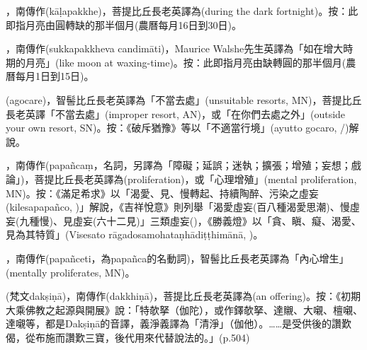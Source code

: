 \startitemgroup[noteitems]
\item{}，南傳作(kāḷapakkhe)，菩提比丘長老英譯為(during the dark fortnight)。按：此即指月亮由圓轉缺的那半個月(農曆每月16日到30日)。
\item{}，南傳作(sukkapakkheva candimāti)，Maurice Walshe先生英譯為「如在增大時期的月亮」(like moon at waxing-time)。按：此即指月亮由缺轉圓的那半個月(農曆每月1日到15日)。
\stopitemgroup

\startitemgroup[noteitems]
\item{}(agocare)，智髻比丘長老英譯為「不當去處」(unsuitable resorts, MN)，菩提比丘長老英譯「不當去處」(improper resort, AN)，或「在你們去處之外」(outside your own resort, SN)。按：《破斥猶豫》等以「不適當行境」(ayutto gocaro, /)解說。
\stopitemgroup

\startitemgroup[noteitems]
\item{}，南傳作(papañcaṃ，名詞，另譯為「障礙；延誤；迷執；擴張；增殖；妄想；戲論」)，菩提比丘長老英譯為(proliferation)，或「心理增殖」(mental proliferation, MN)。按：《滿足希求》以「渴愛、見、慢轉起、持續陶醉、污染之虛妄(kilesapapañco, )」解說，《吉祥悅意》則列舉「渴愛虛妄(百八種渴愛思潮)、慢虛妄(九種慢)、見虛妄(六十二見)」三類虛妄()，《勝義燈》以「貪、瞋、癡、渴愛、見為其特質」(Visesato rāgadosamohataṇhādiṭṭhimānā, )。
\item{}，南傳作(papañceti，為papañca的名動詞)，智髻比丘長老英譯為「內心增生」(mentally proliferates, MN)。
\stopitemgroup

\startitemgroup[noteitems]
\item{}(梵文dakṣiṇā)，南傳作(dakkhiṇā)，菩提比丘長老英譯為(an offering)。按：《初期大乘佛教之起源與開展》說：「特欹拏（伽陀），或作鐸欹拏、達䞋、大嚫、檀嚫、達嚫等，都是Dakṣiṇā的音譯，義淨義譯為「清淨」（伽他）。……是受供後的讚歎偈，從布施而讚歎三寶，後代用來代替說法的。」(p.504)
\stopitemgroup

